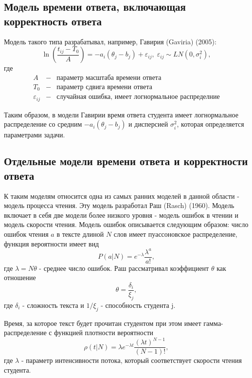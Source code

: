 \subsection{Модель времени ответа, включающая корректность ответа}

Модель такого типа разрабатывал, например, Гавирия (Gaviria) (2005):
\begin{equation}
\ln \left( \frac{t_{ij} - T_0}{A}\right) = -a_i(\theta_j - b_j) + \varepsilon_{ij},\; \varepsilon_{ij} \sim LN(0,\sigma_{i}^{2}),
\end{equation}
где
$$
\begin{array}{lll}
A &-& \mbox{параметр масштаба времени ответа}\\
T_0 &-& \mbox{параметр сдвига времени ответа}\\
\varepsilon_{ij} &-& \mbox{случайная ошибка, имеет логнормальное распределние}
\end{array}
$$

Таким образом, в модели Гавирии время ответа студента имеет логнор\-мальное распределение со средним $-a_i(\theta_j - b_j)$ и дисперсией $\sigma_{i}^{2}$, которая определяется параметрами задачи.

\subsection{Отдельные модели времени ответа и корректности ответа}

К таким моделям относится одна из самых ранних моделей в данной области - модель процесса чтения. Эту модель разработал Раш (Rasch) (1960). Модель включает в себя две модели более низкого уровня - модель ошибок в чтении и модель скорости чтения.
Модель ошибок описывается следующим образом: число ошибок чтения $a$ в тексте длиной $N$ слов имеет пуассоновское распределение, функция вероятности имеет вид
\begin{equation}
P(a | N) = e^{-\lambda}\frac{\lambda^a}{a!},
\end{equation}
где $\lambda = N\theta$ - среднее число ошибок. Раш рассматривал коэффициент $\theta$ как отношение
\begin{equation}
\theta = \frac{\delta_i}{\xi_j},
\end{equation}
где $\delta_i$ - сложность текста и $1/\xi_j$ - способность студента j.

Время, за которое текст будет прочитан студентом при этом имеет гамма-распределение с функцией плотности вероятности
\begin{equation}
\rho (t | N) = \lambda e^{-\lambda t}\frac{(\lambda t)^{N-1}}{(N-1)!},
\end{equation}
где $\lambda$ - параметр интенсивности потока, который соответствует скорости чтения студента.

